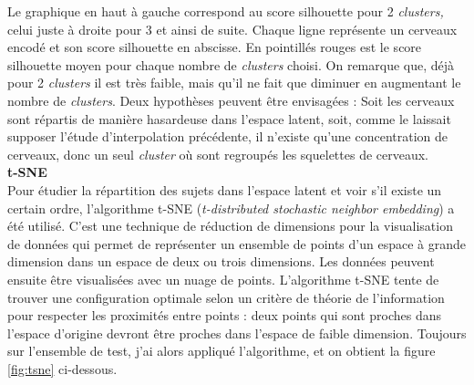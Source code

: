 \documentclass[12pt, oneside, a4paper, titlepage]{article}
\begin{document}
Le graphique en haut à gauche correspond au score silhouette pour 2 \textit{clusters,} celui juste à droite pour 3 et ainsi de suite. Chaque ligne représente un cerveaux encodé et son score silhouette en abscisse.
En pointillés rouges est le score silhouette moyen pour chaque nombre de \textit{clusters} choisi. On remarque que, déjà pour 2 \textit{clusters} il est très faible, mais qu'il ne fait que diminuer en augmentant le nombre de \textit{clusters}.
Deux hypothèses peuvent être envisagées : Soit les cerveaux sont répartis de manière hasardeuse dans l'espace latent, soit, comme le laissait supposer l'étude d'interpolation précédente, il n'existe qu'une concentration de cerveaux, donc un seul \textit{cluster } où sont regroupés les squelettes de cerveaux.\\

\textbf{t-SNE}\\


Pour étudier la répartition des sujets dans l'espace latent et voir s'il existe un certain ordre, l'algorithme t-SNE (\textit{t-distributed stochastic neighbor embedding}) a été utilisé. C'est une technique de réduction de dimensions pour la visualisation de données qui permet de représenter un ensemble de points d'un espace à grande dimension dans un espace de deux ou trois dimensions. Les données peuvent ensuite être visualisées avec un nuage de points. L'algorithme t-SNE tente de trouver une configuration optimale selon un critère de théorie de l'information pour respecter les proximités entre points : deux points qui sont proches dans l'espace d'origine devront être proches dans l'espace de faible dimension. Toujours sur l'ensemble de test, j'ai alors appliqué l'algorithme, et on obtient la figure \ref{fig:tsne} ci-dessous.
\end{document}
